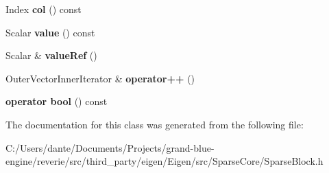 \begin{DoxyCompactItemize}
Index {\bfseries col} () const
\item 
\mbox{\label{class_eigen_1_1internal_1_1unary__evaluator_3_01_block_3_01_arg_type_00_01_block_rows_00_01_bloc652d26bcece9990189dc15f4df1c964f_af81d5617bbe1440bb2d1656538ac9759}} 
Scalar {\bfseries value} () const
\item 
\mbox{\label{class_eigen_1_1internal_1_1unary__evaluator_3_01_block_3_01_arg_type_00_01_block_rows_00_01_bloc652d26bcece9990189dc15f4df1c964f_af3bd367f770626bb5b24ec5c46deca3e}} 
Scalar \& {\bfseries value\+Ref} ()
\item 
\mbox{\label{class_eigen_1_1internal_1_1unary__evaluator_3_01_block_3_01_arg_type_00_01_block_rows_00_01_bloc652d26bcece9990189dc15f4df1c964f_a33fbca649cb90b3ecf57766bf6d7344a}} 
Outer\+Vector\+Inner\+Iterator \& {\bfseries operator++} ()
\item 
\mbox{\label{class_eigen_1_1internal_1_1unary__evaluator_3_01_block_3_01_arg_type_00_01_block_rows_00_01_bloc652d26bcece9990189dc15f4df1c964f_a1f74114177a9c701e8d90a8856921c6d}} 
{\bfseries operator bool} () const
\end{DoxyCompactItemize}


The documentation for this class was generated from the following file\+:\begin{DoxyCompactItemize}
\item 
C\+:/\+Users/dante/\+Documents/\+Projects/grand-\/blue-\/engine/reverie/src/third\+\_\+party/eigen/\+Eigen/src/\+Sparse\+Core/Sparse\+Block.\+h\end{DoxyCompactItemize}
